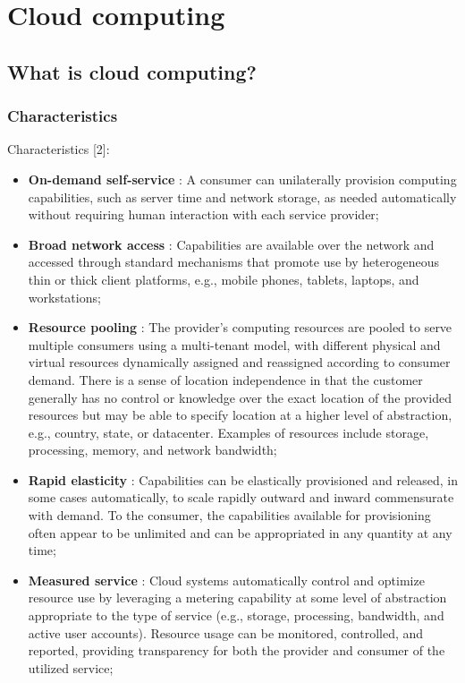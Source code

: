 \chapter{Cloud computing}


\section{What is cloud computing?}



\subsection{Characteristics}

Characteristics [2]:

\begin{itemize}
	\item \textbf{On-demand self-service} : A consumer can unilaterally provision computing capabilities, such as server time and network storage, as needed automatically without requiring human interaction with each service provider;
	\item \textbf{Broad network access} : Capabilities are available over the network and accessed through standard mechanisms that promote use by heterogeneous thin or thick client platforms, e.g., mobile phones, tablets, laptops, and workstations;
	\item \textbf{Resource pooling} : The provider's computing resources are pooled to serve multiple consumers using a multi-tenant model, with different physical and virtual resources dynamically assigned and reassigned according to consumer demand. There is a sense of location independence in that the customer generally has no control or knowledge over the exact location of the provided resources but may be able to specify location at a higher level of abstraction, e.g., country, state, or datacenter. Examples of resources include storage, processing, memory, and network bandwidth;
	\item \textbf{Rapid elasticity} : Capabilities can be elastically provisioned and released, in some cases automatically, to scale rapidly outward and inward commensurate with demand. To the consumer, the capabilities available for provisioning often appear to be unlimited and can be appropriated in any quantity at any time;
	\item \textbf{Measured service} : Cloud systems automatically control and optimize resource use by leveraging a metering capability at some level of abstraction appropriate to the type of service (e.g., storage, processing, bandwidth, and active user accounts). Resource usage can be monitored, controlled, and reported, providing transparency for both the provider and consumer of the utilized service;
\end{itemize}



